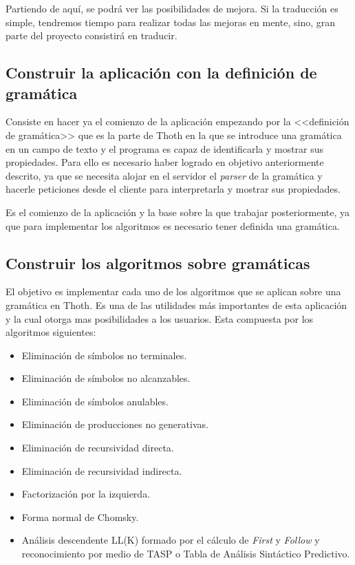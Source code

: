 Partiendo de aquí, se podrá ver las posibilidades de mejora. Si la traducción es simple, tendremos tiempo para realizar todas las mejoras en mente, sino, gran parte del proyecto consistirá en traducir.

\subsection{Construir la aplicación con la definición de gramática}

Consiste en hacer ya el comienzo de la aplicación empezando por la <<definición de gramática>> que es la parte de Thoth en la que se introduce una gramática en un campo de texto y el programa es capaz de identificarla y mostrar sus propiedades. Para ello es necesario haber logrado en objetivo anteriormente descrito, ya que se necesita alojar en el servidor el \emph{parser} de la gramática y hacerle peticiones desde el cliente para interpretarla y mostrar sus propiedades.

Es el comienzo de la aplicación y la base sobre la que trabajar posteriormente, ya que para implementar los algoritmos es necesario tener definida una gramática.

\subsection{Construir los algoritmos sobre gramáticas}

El objetivo es implementar cada uno de los algoritmos que se aplican sobre una gramática en Thoth. Es una de las utilidades más importantes de esta aplicación y la cual otorga mas posibilidades a los usuarios. Esta compuesta por los algoritmos siguientes:

\begin{itemize}
\item Eliminación de símbolos no terminales.
\item Eliminación de símbolos no alcanzables. 
\item Eliminación de símbolos anulables.
\item Eliminación de producciones no generativas.
\item Eliminación de recursividad directa.
\item Eliminación de recursividad indirecta.
\item Factorización por la izquierda.
\item Forma normal de Chomsky.
\item Análisis descendente LL(K) formado por el cálculo de \emph{First} y \emph{Follow} y reconocimiento por medio de TASP o Tabla de Análisis Sintáctico Predictivo.
\end{itemize}

